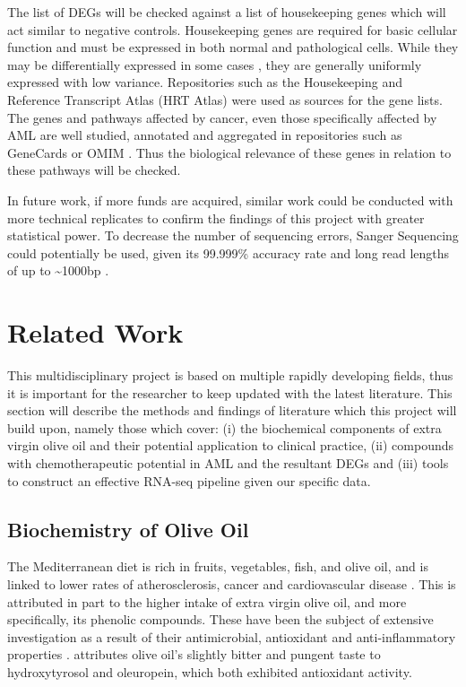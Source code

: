 The list of \ac{DEG}s will be checked against a list of housekeeping genes which will act similar to negative controls. Housekeeping genes are required for basic cellular function and must be expressed in both normal and pathological cells. While they may be differentially expressed in some cases \citep{greer2010housekeeping}, they are generally uniformly expressed with low variance. Repositories such as the Housekeeping and Reference Transcript Atlas (HRT Atlas) \citep{hounkpe2021hrt} were used as sources for the gene lists. %
The genes and pathways affected by cancer, even those specifically affected by \ac{AML} are well studied, annotated and aggregated in repositories such as GeneCards \citep{stelzer2016genecards} or OMIM \citep{hamosh2005online}. Thus the biological relevance of these genes in relation to these pathways will be checked.

In future work, if more funds are acquired, similar work could be conducted with more technical replicates to confirm the findings of this project with greater statistical power. To decrease the number of sequencing errors, Sanger Sequencing could potentially be used, given its 99.999\% accuracy rate and long read lengths of up to \textasciitilde 1000bp \citep{shendure2008next}.

\section{Related Work}
This multidisciplinary project is based on multiple rapidly developing fields, thus it is important for the researcher to keep updated with the latest literature. This section will describe the methods and findings of literature which this project will build upon, namely those which cover: (i) the biochemical components of extra virgin olive oil and their potential application to clinical practice, (ii) compounds with chemotherapeutic potential in \ac{AML} and the resultant \ac{DEG}s and (iii) tools to construct an effective RNA-seq pipeline given our specific data.

\subsection{Biochemistry of Olive Oil}
The Mediterranean diet is rich in fruits, vegetables, fish, and olive oil, and is linked to lower rates of atherosclerosis, cancer and cardiovascular disease \citep{owen2000, tripoli2005phenolic, cicerale2012antimicrobial, fabiani2002cancer}. This is attributed in part to the higher intake of extra virgin olive oil, and more specifically, its phenolic compounds. These have been the subject of extensive investigation as a result of their antimicrobial, antioxidant and anti-inflammatory properties \citep{cicerale2012antimicrobial, tripoli2005phenolic, bendini2007phenolic, serreli2018biological}. \cite{tripoli2005phenolic} attributes olive oil's slightly bitter and pungent taste to hydroxytyrosol and oleuropein, which both exhibited antioxidant activity.

